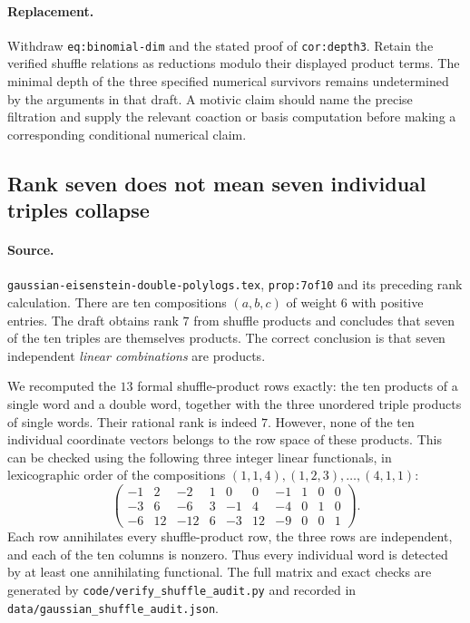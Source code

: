\paragraph{Replacement.}
Withdraw \texttt{eq:binomial-dim} and the stated proof of
\texttt{cor:depth3}. Retain the verified shuffle relations as reductions
modulo their displayed product terms. The minimal depth of the three
specified numerical survivors remains undetermined by the arguments in
that draft. A motivic claim should name the precise filtration and supply
the relevant coaction or basis computation before making a corresponding
conditional numerical claim.

\subsection{Rank seven does not mean seven individual triples collapse}
\label{audit:poly:shuffle-rank}

\paragraph{Source.}
\texttt{gaussian-eisenstein-double-polylogs.tex},
\texttt{prop:7of10} and its preceding rank calculation.
There are ten compositions $(a,b,c)$ of weight $6$ with positive entries.
The draft obtains rank $7$ from shuffle products and concludes that seven
of the ten triples are themselves products. The correct conclusion is
that seven independent \emph{linear combinations} are products.

We recomputed the $13$ formal shuffle-product rows exactly: the ten
products of a single word and a double word, together with the three
unordered triple products of single words. Their rational rank is indeed
$7$. However, none of the ten individual coordinate vectors belongs to
the row space of these products.
This can be checked using the following three integer linear functionals,
in lexicographic order of the compositions
$(1,1,4),(1,2,3),\ldots,(4,1,1)$:
\[
 \begin{pmatrix}
 -1&2&-2&1&0&0&-1&1&0&0\\
 -3&6&-6&3&-1&4&-4&0&1&0\\
 -6&12&-12&6&-3&12&-9&0&0&1
 \end{pmatrix}.
\]
Each row annihilates every shuffle-product row, the three rows are
independent, and each of the ten columns is nonzero.
Thus every individual word is detected by at least one annihilating
functional. The full matrix and exact checks are generated by
\texttt{code/verify\_shuffle\_audit.py} and recorded in
\texttt{data/gaussian\_shuffle\_audit.json}.

